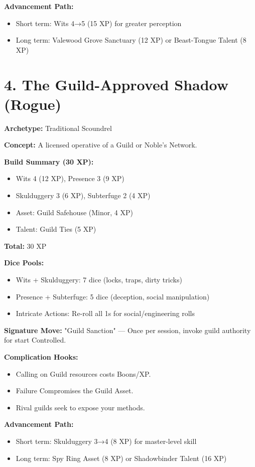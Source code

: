 \textbf{Advancement Path:}
\begin{itemize}
  \item Short term: Wits 4→5 (15 XP) for greater perception
  \item Long term: Valewood Grove Sanctuary (12 XP) or Beast-Tongue Talent (8 XP)
\end{itemize}

\section{4. The Guild-Approved Shadow (Rogue)}
\textbf{Archetype:} Traditional Scoundrel

\textbf{Concept:} A licensed operative of a Guild or Noble's Network.

\textbf{Build Summary (30 XP):}
\begin{itemize}
  \item Wits 4 (12 XP), Presence 3 (9 XP)
  \item Skulduggery 3 (6 XP), Subterfuge 2 (4 XP)
  \item Asset: Guild Safehouse (Minor, 4 XP)
  \item Talent: Guild Ties (5 XP)
\end{itemize}
\textbf{Total:} 30 XP

\textbf{Dice Pools:}
\begin{itemize}
  \item Wits + Skulduggery: 7 dice (locks, traps, dirty tricks)
  \item Presence + Subterfuge: 5 dice (deception, social manipulation)
  \item Intricate Actions: Re-roll all 1s for social/engineering rolls
\end{itemize}

\textbf{Signature Move:} "Guild Sanction" — Once per session, invoke guild authority for start Controlled.

\textbf{Complication Hooks:}
\begin{itemize}
  \item Calling on Guild resources costs Boons/XP.
  \item Failure Compromises the Guild Asset.
  \item Rival guilds seek to expose your methods.
\end{itemize}

\textbf{Advancement Path:}
\begin{itemize}
  \item Short term: Skulduggery 3→4 (8 XP) for master-level skill
  \item Long term: Spy Ring Asset (8 XP) or Shadowbinder Talent (16 XP)
\end{itemize}

